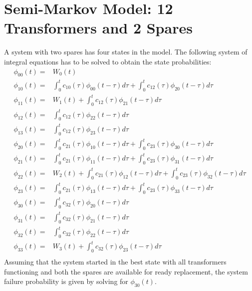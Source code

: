 \appendix

\section{Semi-Markov Model: 12 Transformers and 2 Spares}
A system with two spares has four states in the model. The following system of integral equations has to be solved to obtain the state probabilities:
\allowdisplaybreaks 
\begin{align*}
\phi_{00}(t) = &W_0(t) \\
\phi_{10}(t) = &\int_0^t{ c_{10}(\tau)\phi_{00}(t-\tau) }d\tau +\int_0^t{ c_{12}(\tau)\phi_{20}(t-\tau) }d\tau \\
\phi_{11}(t) = &W_1(t) + \int_0^t{ c_{12}(\tau)\phi_{21}(t-\tau) }d\tau \\
\phi_{12}(t) = &\int_0^t{ c_{12}(\tau)\phi_{22}(t-\tau) }d\tau \\
\phi_{13}(t) = &\int_0^t{ c_{12}(\tau)\phi_{23}(t-\tau) }d\tau \\
\phi_{20}(t) = &\int_0^t{ c_{21}(\tau)\phi_{10}(t-\tau) }d\tau +\int_0^t{ c_{23}(\tau)\phi_{30}(t-\tau) }d\tau \\
\phi_{21}(t) = &\int_0^t{ c_{21}(\tau)\phi_{11}(t-\tau) }d\tau +\int_0^t{ c_{23}(\tau)\phi_{31}(t-\tau) }d\tau \\
\phi_{22}(t) = &W_2(t) + \int_0^t{ c_{21}(\tau)\phi_{12}(t-\tau) }d\tau +\int_0^t{ c_{23}(\tau)\phi_{32}(t-\tau) }d\tau \\
\phi_{23}(t) = &\int_0^t{ c_{21}(\tau)\phi_{13}(t-\tau) }d\tau +\int_0^t{ c_{23}(\tau)\phi_{33}(t-\tau) }d\tau \\
\phi_{30}(t) = &\int_0^t{ c_{32}(\tau)\phi_{20}(t-\tau) }d\tau \\
\phi_{31}(t) = &\int_0^t{ c_{32}(\tau)\phi_{21}(t-\tau) }d\tau \\
\phi_{32}(t) = &\int_0^t{ c_{32}(\tau)\phi_{22}(t-\tau) }d\tau \\
\phi_{33}(t) = &W_3(t) + \int_0^t{ c_{32}(\tau)\phi_{23}(t-\tau) }d\tau \\
\end{align*}
Assuming that the system started in the best state with all transformers functioning and both the spares are available for ready replacement, the system failure probability is given by solving for $\phi_{30}(t)$.


